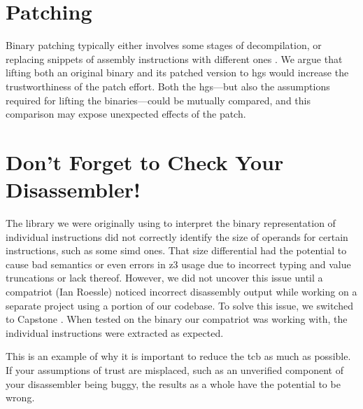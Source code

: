\section{Patching}
Binary patching typically either involves some stages of decompilation, or replacing snippets of assembly instructions with different ones \autocite{duck2020binary}.
We argue that lifting both an original binary and its patched version to \acp{hg} would increase the trustworthiness of the patch effort.
Both the \acp{hg}---but also the assumptions required for lifting the binaries---could be mutually compared, and this comparison may expose unexpected effects of the patch.

\section{Don't Forget to Check Your Disassembler!}
The library we were originally using to interpret the binary representation of individual instructions did not correctly identify the size of operands for certain instructions, such as some \ac{simd} ones.
That size differential had the potential to cause bad semantics or even errors in \gls{z3} usage due to incorrect typing and value truncations or lack thereof.
However, we did not uncover this issue until a compatriot (Ian Roessle) noticed incorrect disassembly output while working on a separate project using a portion of our codebase.
To solve this issue, we switched to Capstone \autocite{capstone}.
When tested on the binary our compatriot was working with, the individual instructions were extracted as expected.

This is an example of why it is important to reduce the \ac{tcb} as much as possible.
If your assumptions of trust are misplaced, such as an unverified component of your disassembler being buggy, the results as a whole have the potential to be wrong.
